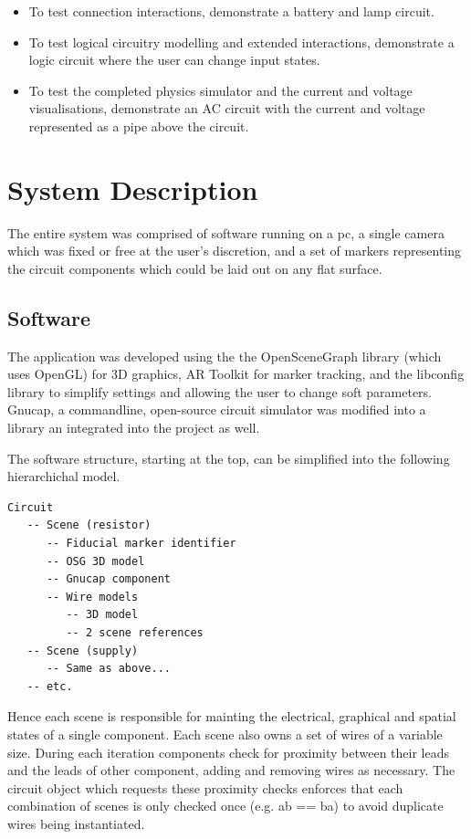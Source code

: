\begin{itemize}
\item To test connection interactions, demonstrate a battery and lamp circuit.
\item To test logical circuitry modelling and extended interactions, demonstrate a logic circuit where the user can change input states.
\item To test the completed physics simulator and the current and voltage visualisations, demonstrate an AC circuit with the current and voltage represented as a pipe above the circuit.
\end{itemize}

\section{System Description}
The entire system was comprised of software running on a pc,
a single camera which was fixed or free at the user's discretion,
and a set of markers representing the circuit components which
could be laid out on any flat surface.

\subsection{Software}
The application was developed using the the OpenSceneGraph library
(which uses OpenGL) for 3D graphics, AR Toolkit for marker
tracking, and the libconfig library to simplify settings and
allowing the user to change soft parameters. Gnucap, a commandline,
open-source circuit simulator was modified into a library an
integrated into the project as well.

The software structure, starting at the top, can be simplified into
the following hierarchichal model.

\begin{verbatim}
Circuit
   -- Scene (resistor)
      -- Fiducial marker identifier
      -- OSG 3D model
      -- Gnucap component
      -- Wire models
         -- 3D model
         -- 2 scene references
   -- Scene (supply)
      -- Same as above...
   -- etc.
\end{verbatim}

Hence each scene is responsible for mainting the electrical, graphical
and spatial states of a single component. Each scene also owns a set of
wires of a variable size. During each iteration components check for
proximity between their leads and the leads of other component, adding
and removing wires as necessary. The circuit object which requests these
proximity checks enforces that each combination of scenes is only checked
once (e.g. ab == ba) to avoid duplicate wires being instantiated.

